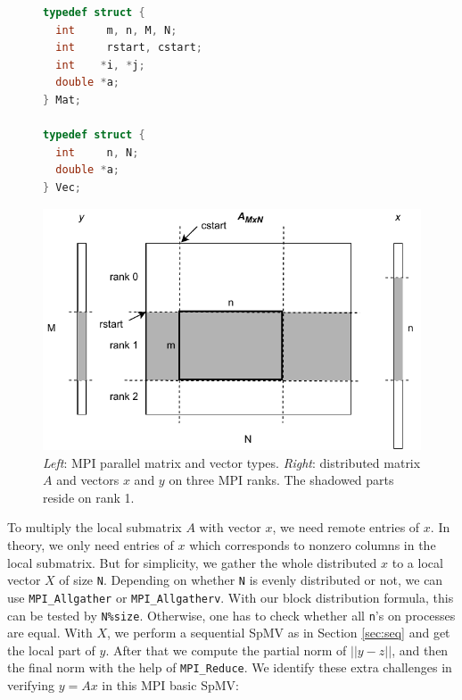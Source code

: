 \documentclass[submission]{eptcs}
\begin{document}
\vspace{-10pt}
\begin{figure}[h]
\begin{minipage}{0.35\textwidth}
\begin{lstlisting}[language=C]
typedef struct {
  int     m, n, M, N;
  int     rstart, cstart;
  int    *i, *j;
  double *a;
} Mat;

typedef struct {
  int     n, N;
  double *a;
} Vec;
\end{lstlisting}
\end{minipage}
\hfill
\begin{minipage}{0.60\textwidth}
    \includegraphics[width=1.0\textwidth]{figs/MPICSR.pdf}
\end{minipage}
\vspace{-10pt}
\caption{{\it Left}: MPI parallel matrix and vector types.
{\it Right}: distributed matrix $A$ and vectors $x$ and $y$ on three MPI ranks.
The shadowed parts reside on rank 1.}
\label{fig:mpicsr}
\vspace{-5pt}
\end{figure}


To multiply the local submatrix $A$ with vector $x$, we need remote entries of $x$. In theory, we only
need entries of $x$ which corresponds to nonzero columns in the local submatrix. But for simplicity,
we gather the whole distributed $x$ to a local vector $X$ of size {\tt N}.
Depending on whether {\tt N} is evenly distributed or not, we can use {\tt MPI_Allgather} or {\tt MPI_Allgatherv}.
With our block distribution formula, this can be tested by {\tt N\%size}. Otherwise,
one has to check whether all {\tt n}'s on processes are equal.
With $X$, we perform a sequential SpMV as in Section \ref{sec:seq} and get the local part of
$y$. After that we compute the partial norm of $||y - z||$, and then the final norm with the help of {\tt MPI_Reduce}.
We identify these extra challenges in verifying $y=Ax$ in this MPI basic SpMV:
\end{document}
